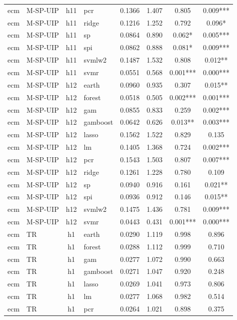 \begin{ThreePartTable}
\begin{longtable}[t]{llclcccc}
ecm & M-SP-UIP & h11 & pcr & 0.1366 & 1.407 & 0.805 & 0.009***\\
ecm & M-SP-UIP & h11 & ridge & 0.1216 & 1.252 & 0.792 & 0.096*\\
ecm & M-SP-UIP & h11 & sp & 0.0864 & 0.890 & 0.062* & 0.005***\\
ecm & M-SP-UIP & h11 & spi & 0.0862 & 0.888 & 0.081* & 0.009***\\
ecm & M-SP-UIP & h11 & svmlw2 & 0.1487 & 1.532 & 0.808 & 0.012**\\
ecm & M-SP-UIP & h11 & svmr & 0.0551 & 0.568 & 0.001*** & 0.000***\\
\addlinespace
ecm & M-SP-UIP & h12 & earth & 0.0960 & 0.935 & 0.307 & 0.015**\\
ecm & M-SP-UIP & h12 & forest & 0.0518 & 0.505 & 0.002*** & 0.001***\\
ecm & M-SP-UIP & h12 & gam & 0.0855 & 0.833 & 0.259 & 0.002***\\
ecm & M-SP-UIP & h12 & gamboost & 0.0642 & 0.626 & 0.013** & 0.003***\\
ecm & M-SP-UIP & h12 & lasso & 0.1562 & 1.522 & 0.829 & 0.135\\
ecm & M-SP-UIP & h12 & lm & 0.1405 & 1.368 & 0.724 & 0.002***\\
ecm & M-SP-UIP & h12 & pcr & 0.1543 & 1.503 & 0.807 & 0.007***\\
ecm & M-SP-UIP & h12 & ridge & 0.1261 & 1.228 & 0.780 & 0.109\\
ecm & M-SP-UIP & h12 & sp & 0.0940 & 0.916 & 0.161 & 0.021**\\
ecm & M-SP-UIP & h12 & spi & 0.0936 & 0.912 & 0.146 & 0.015**\\
ecm & M-SP-UIP & h12 & svmlw2 & 0.1475 & 1.436 & 0.781 & 0.009***\\
ecm & M-SP-UIP & h12 & svmr & 0.0443 & 0.431 & 0.001*** & 0.000***\\
\addlinespace
ecm & TR & h1 & earth & 0.0290 & 1.119 & 0.998 & 0.896\\
ecm & TR & h1 & forest & 0.0288 & 1.112 & 0.999 & 0.710\\
ecm & TR & h1 & gam & 0.0277 & 1.072 & 0.990 & 0.663\\
ecm & TR & h1 & gamboost & 0.0271 & 1.047 & 0.920 & 0.248\\
ecm & TR & h1 & lasso & 0.0269 & 1.041 & 0.973 & 0.806\\
ecm & TR & h1 & lm & 0.0277 & 1.068 & 0.982 & 0.514\\
ecm & TR & h1 & pcr & 0.0264 & 1.021 & 0.898 & 0.375\\

\end{longtable}
\end{ThreePartTable}
